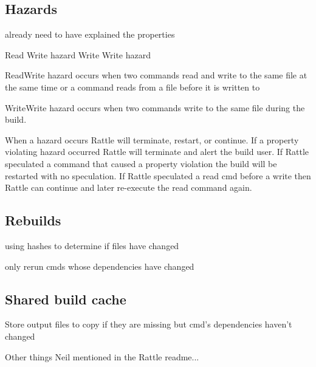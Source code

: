 \subsection{Hazards}

already need to have explained the properties

Read Write hazard
Write Write hazard

ReadWrite hazard occurs when two commands read and write to the same file at the same time
or a command reads from a file before it is written to

WriteWrite hazard occurs when two commands write to the same file during the build.

When a hazard occurs Rattle will terminate, restart, or continue.  If a property violating hazard
occurred Rattle will terminate and alert the build user.  If Rattle speculated a command that
caused a property violation the build will be restarted with no speculation.
If Rattle speculated a read cmd before a write then Rattle can continue and later re-execute the
read command again.


\subsection{Rebuilds}

using hashes to determine if files have changed

only rerun cmds whose dependencies have changed

\subsection{Shared build cache}

Store output files to copy if they are missing but cmd's dependencies haven't changed

Other things Neil mentioned in the Rattle readme...
